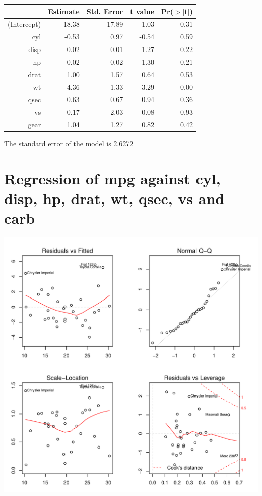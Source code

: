 \documentclass{article}\usepackage[]{graphicx}\usepackage[]{color}
\makeatletter
\def\maxwidth{ %
  \ifdim\Gin@nat@width>\linewidth
    \linewidth
  \else
    \Gin@nat@width
  \fi
}
\newenvironment{knitrout}{}{} %
\makeatother
\begin{document}
\begin{table}[ht]
\centering
\begin{tabular}{rrrrr}
  \hline
 & Estimate & Std. Error & t value & Pr($>$$|$t$|$) \\ 
  \hline
(Intercept) & 18.38 & 17.89 & 1.03 & 0.31 \\ 
  cyl & -0.53 & 0.97 & -0.54 & 0.59 \\ 
  disp & 0.02 & 0.01 & 1.27 & 0.22 \\ 
  hp & -0.02 & 0.02 & -1.30 & 0.21 \\ 
  drat & 1.00 & 1.57 & 0.64 & 0.53 \\ 
  wt & -4.36 & 1.33 & -3.29 & 0.00 \\ 
  qsec & 0.63 & 0.67 & 0.94 & 0.36 \\ 
  vs & -0.17 & 2.03 & -0.08 & 0.93 \\ 
  gear & 1.04 & 1.27 & 0.82 & 0.42 \\ 
   \hline
\end{tabular}
\end{table}




The standard error of the model is 2.6272

\newpage

\section{Regression of mpg against cyl, disp, hp, drat, wt, qsec, vs and carb }
\begin{knitrout}
\color{fgcolor}

{\centering \includegraphics[width=\maxwidth]{figure/lm-cyl-disp-hp-drat-wt-qsec-vs-carb} 

}



\end{knitrout}
\end{document}
